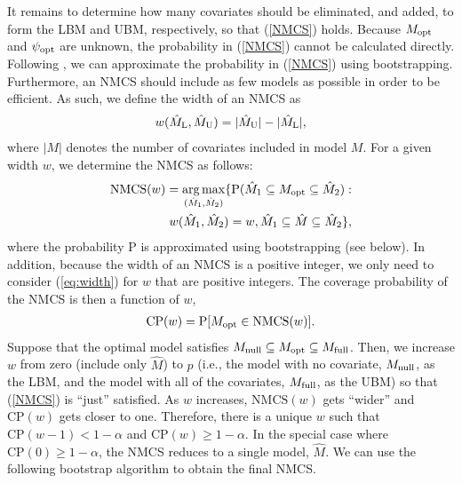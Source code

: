 \documentclass[12pt]{article} %
\DeclareMathOperator*{\argmax}{arg\,max}
\theoremstyle{definition}
\begin{document}
It remains to determine how many covariates should be eliminated, and added, to form the LBM and UBM, respectively, so that (\ref{NMCS}) holds. Because $M_{\rm opt}$ and $\psi_{\rm opt}$ are unknown, the probability in (\ref{NMCS}) cannot be calculated directly. Following \citet{Liu2021}, we can approximate the probability in (\ref{NMCS}) using bootstrapping. Furthermore, an NMCS should include as few models as possible in order to be efficient. As such, we define the width of an NMCS as
\begin{eqnarray}\label{eq:width}
w(\hat{M}_{\rm L}, \hat{M}_{\rm U})= |\hat{M}_{\rm U}|- |\hat{M}_{\rm L}|,
\end{eqnarray}
where $|M|$ denotes the number of covariates included in model $M$. For a given width $w$, we determine the NMCS as follows:
\begin{eqnarray}\label{eq:NMCS}
\text{NMCS}(w)= \argmax_{(\hat{M}_1, \hat{M}_2)}\{{\rm P}(\hat{M}_1 \subseteq M_{\rm opt} \subseteq \hat{M}_2) : \nonumber \\
w(\hat{M}_1, \hat{M}_2)= w, \hat{M}_1 \subseteq \hat{M} \subseteq \hat{M}_2\},
\end{eqnarray}
where the probability P is approximated using bootstrapping (see below). In addition, because the width of an NMCS is a positive integer, we only need to consider (\ref{eq:width}) for $w$ that are positive integers. The coverage probability of the NMCS is then a function of $w$,
\begin{eqnarray}\label{eq:CP}
\text{CP}(w) = {\rm P}[M_{\rm opt} \in \text{NMCS}(w)].
\end{eqnarray}
Suppose that the optimal model satisfies $M_{\rm null}\subseteq M_{\rm opt}\subseteq M_{\rm full}$. Then, we increase $w$ from zero (include only $\hat{M}$) to $p$ (i.e., the model with no covariate, $M_{\rm null}$, as the LBM, and the model with all of the covariates, $M_{\rm full}$, as the UBM) so that (\ref{NMCS}) is ``just'' satisfied. As $w$ increases, $\text{NMCS}(w)$ gets ``wider'' and $\text{CP}(w)$ gets closer to one. Therefore, there is a unique $w$ such that $\text{CP}(w-1) < 1-\alpha$ and $\text{CP}(w) \geq 1-\alpha$. In the special case where $\text{CP}(0)\geq 
1-\alpha$, the NMCS reduces to a single model, $\hat{M}$. We can use the following bootstrap algorithm to obtain the final NMCS.
\end{document}
